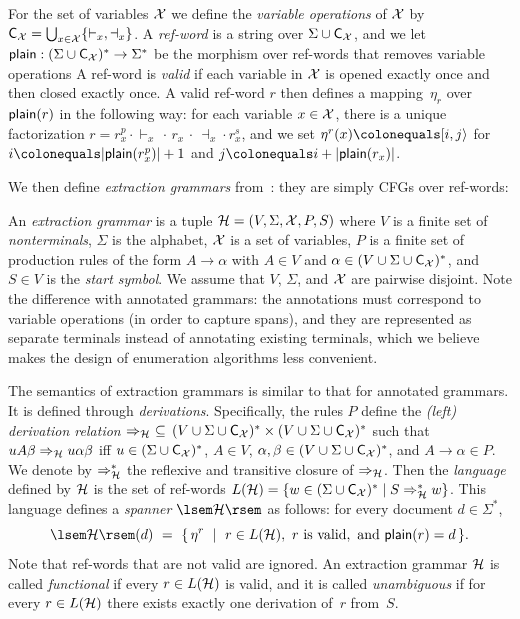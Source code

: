 \begin{definition}
  \label{def:refwords}
For the set of variables $\mathcal{X}$ we define the \emph{variable operations} of $\mathcal{X}$ by
$\textsf{C}_{\mathcal{X}} = \bigcup_{x \in \mathcal{X}} \{ {\vdash_x}, {\dashv_x} \}$.
A \emph{ref-word} is a string over $\Sigma \cup \textsf{C}_{\mathcal{X}}$, and we let
  $\textsf{plain}: (\Sigma \cup \textsf{C}_{\mathcal{X}})^* \rightarrow \Sigma^*$ be the morphism
  over ref-words that removes variable operations
A ref-word is {\em valid} if each variable in $\mathcal{X}$ is opened exactly once and then closed exactly once.
A valid ref-word $r$ then defines a mapping~$\eta_r$ over $\textsf{plain}(r)$ in the following way:
for each variable $x \in \mathcal{X}$, there is a unique factorization $r = r_x^p \cdot \vdash_x \, \cdot \, r_x \, \cdot\, \dashv_x \cdot r_x^s$,
and we set 
$\eta^r(x) \colonequals \spanc{i}{j}$ for $i \colonequals |\splain(r_x^p)|+1$ and $j \colonequals i + |\splain(r_x)|$. 
\end{definition}

We then define \emph{extraction grammars} from~\cite{Peterfreund21}: they are
simply CFGs over ref-words:

\begin{definition}
  \label{def:extract}
An \emph{extraction grammar} is a tuple
$\mathcal{H} = (V, \Sigma, \mathcal{X}, P, \allowbreak S)$ where 
$V$ is a finite set of \emph{nonterminals},
$\Sigma$ is the alphabet,
$\mathcal{X}$ is a set of variables, 
$P$ is a finite set of production rules of the form $A \to \alpha$ with $A \in
V$ and $\alpha \in (V \cup \Sigma \cup \textsf{C}_{\mathcal{X}})^*$, and $S \in V$ is the
\emph{start symbol}.
We assume that $V$, $\Sigma$, and $\mathcal{X}$ are pairwise disjoint.
Note the difference with annotated grammars: the annotations must correspond to
variable operations (in order to capture spans), and they are represented as separate terminals
instead of annotating existing terminals, which we believe makes the design of
enumeration algorithms less convenient.

The semantics of extraction grammars is similar to that for annotated grammars.
It is defined through \emph{derivations}. Specifically, the rules $P$ define the
\emph{(left) derivation relation} $\Rightarrow_{\mathcal{H}} \ \subseteq \, (V \cup \Sigma \cup \textsf{C}_{\mathcal{X}})^* \times (V \cup \Sigma \cup  \textsf{C}_{\mathcal{X}})^*$ such that $u A \beta \Rightarrow_{\mathcal{H}} u \alpha \beta$ iff $u \in (\Sigma \cup \textsf{C}_{\mathcal{X}})^*$, $A \in V$, $\alpha, \beta \in (V \cup \Sigma \cup \textsf{C}_{\mathcal{X}})^*$, and $A \rightarrow \alpha \in P$. We denote by $\Rightarrow_{\mathcal{H}}^*$ the reflexive and transitive closure of $\Rightarrow_{\mathcal{H}}$. 
Then the \emph{language} defined by $\mathcal{H}$ is the set of ref-words $L(\mathcal{H}) = \{w \in (\Sigma \cup \textsf{C}_{\mathcal{X}})^* \mid S \Rightarrow_{\mathcal{H}}^* w\}$.
This language defines a \emph{spanner} $\sem{\cH}$ as follows: for every document $d \in \Sigma^*$,
%
%
%
%
%
%
%
%
%
%
%
%
%
  \[
\sem{\cH}(d) \ = \ \{ \, \eta^r \ \mid \ r \in L(\cH), \text{ $r$ is valid}, \text{ and } \splain(r) = d\, \}.
\]
Note that ref-words that are not valid are ignored.
An extraction grammar $\mathcal{H}$ is called \emph{functional} if every $r \in L(\mathcal{H})$ is valid, and it is called \emph{unambiguous} if for every $r \in L(\mathcal{H})$ there exists exactly one derivation of~$r$ from~$S$. 
\end{definition}

